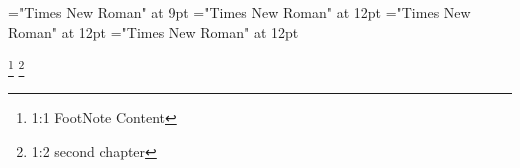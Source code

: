 \documentclass[a4paper]{article}
\begin{document}
 
\pagestyle{plain} 
\font\footnotepsectionscriptureTextscrBody="Times New Roman" at 9pt
\font\psectionscriptureTextscrBody="Times New Roman" at 12pt
\font\sectionscriptureTextscrBody="Times New Roman" at 12pt
\font\scriptureTextscrBody="Times New Roman" at 12pt
\pagestyle{fancy} 
\begin{adjustwidth}{12pt}{0pt}{12pt}{0pt}
  \footnote {1:1 FootNote Content}   \footnote {1:2 second chapter
                  } \end{adjustwidth} 
\end{document}
